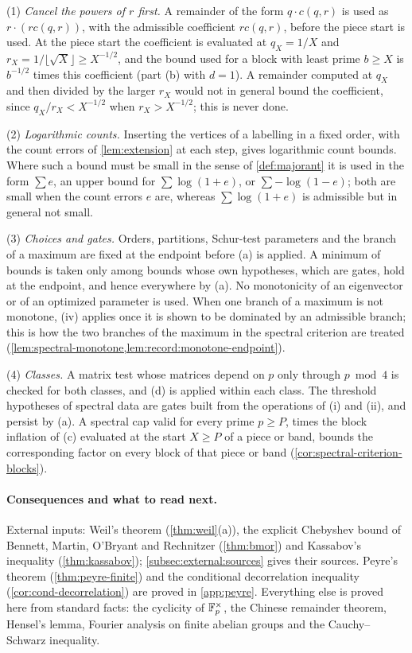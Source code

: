\begin{remark}\label{rem:majorant-use}
(1) \emph{Cancel the powers of $r$ first.} A remainder of the form
$q\cdot c(q,r)$ is used as $r\cdot(rc(q,r))$, with the admissible coefficient
$rc(q,r)$, before the piece start is used. At the piece start the coefficient
is evaluated at $q_X=1/X$ and $r_X=1/\lfloor\sqrt X\rfloor\ge X^{-1/2}$, and the bound used for a
block with least prime $b\ge X$ is $b^{-1/2}$ times this
coefficient (part (b) with $d=1$). A remainder computed at $q_X$ and then
divided by the larger $r_X$ would not in general bound the coefficient, since
$q_X/r_X<X^{-1/2}$ when $r_X>X^{-1/2}$; this is never done.

(2) \emph{Logarithmic counts.} Inserting the vertices of a labelling in a
fixed order, with the count errors of \cref{lem:extension} at each step,
gives logarithmic count bounds. Where such a bound must be small in the sense
of \cref{def:majorant} it is used in the form $\sum e$, an
upper bound for $\sum\log(1+e)$, or $\sum-\log(1-e)$; both are small when the
count errors $e$ are, whereas $\sum\log(1+e)$ is admissible but in general not
small.

(3) \emph{Choices and gates.} Orders, partitions, Schur-test parameters and the
branch of a maximum are fixed at the endpoint before (a) is applied. A minimum
of bounds is taken only among bounds whose own hypotheses, which are gates,
hold at the endpoint, and hence everywhere by (a). No monotonicity of an
eigenvector or of an optimized parameter is used. When one branch of a maximum
is not monotone, (iv) applies once it is shown to be dominated by an admissible
branch; this is how the two branches of the maximum in the spectral criterion
are treated (\cref{lem:spectral-monotone,lem:record:monotone-endpoint}).

(4) \emph{Classes.} A matrix test whose matrices depend on $p$ only through
$p\bmod4$ is checked for both classes, and (d) is applied within each class.
The threshold hypotheses of spectral data are gates built from the
operations of (i) and (ii), and persist by (a). A spectral cap valid for every
prime $p\ge P$, times the block inflation of (c) evaluated at the start
$X\ge P$ of a piece or band, bounds the corresponding factor on every block of
that piece or band (\cref{cor:spectral-criterion-blocks}).
\end{remark}

\paragraph{Consequences and what to read next.}
External inputs: Weil's theorem (\cref{thm:weil}(a)), the explicit Chebyshev
bound of Bennett, Martin, O'Bryant and Rechnitzer (\cref{thm:bmor}) and
Kassabov's inequality (\cref{thm:kassabov}); \cref{subsec:external:sources}
gives their sources. Peyre's theorem (\cref{thm:peyre-finite}) and the
conditional decorrelation inequality (\cref{cor:cond-decorrelation}) are proved
in \cref{app:peyre}. Everything else is proved here from standard facts: the
cyclicity of $\mathbb F_p^\times$, the Chinese remainder theorem, Hensel's lemma,
Fourier analysis on finite abelian groups and the Cauchy--Schwarz inequality.

